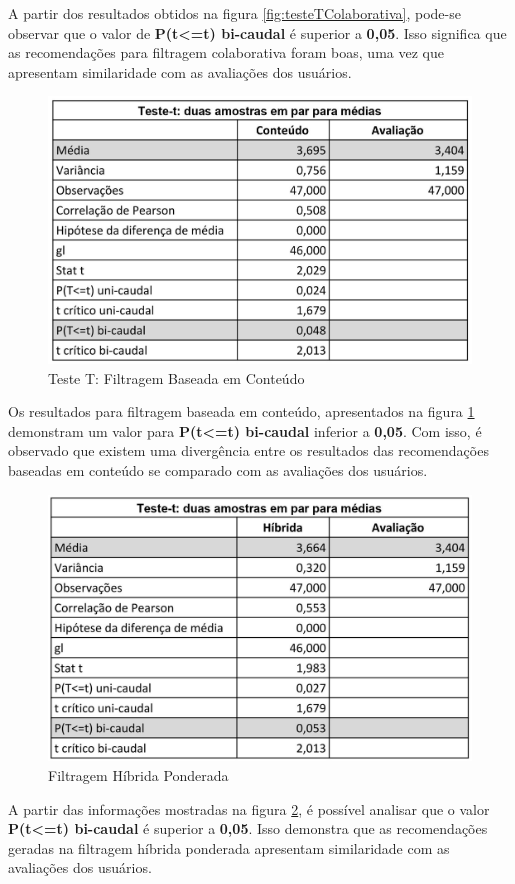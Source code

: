 A partir dos resultados obtidos na figura \ref{fig:testeTColaborativa}, pode-se observar que o valor de \textbf{P(t<=t) bi-caudal} é superior a \textbf{0,05}. Isso significa que as recomendações para filtragem colaborativa foram boas, uma vez que apresentam similaridade com as avaliações dos usuários.

\begin{figure}[H]
	\centering
	\includegraphics[width=.7\linewidth]{imagens/testeTConteudo.jpg}
	\caption[Teste T: Filtragem Baseada em Conteúdo]{Teste T: Filtragem Baseada em Conteúdo}
    \label{fig:testeTConteudo}
\end{figure}

Os resultados para filtragem baseada em conteúdo, apresentados na figura \ref{fig:testeTConteudo} demonstram um valor para \textbf{P(t<=t) bi-caudal} inferior a \textbf{0,05}. Com isso, é observado que existem uma divergência entre os resultados das recomendações baseadas em conteúdo se comparado com as avaliações dos usuários.

\begin{figure}[H]
	\centering
	\includegraphics[width=.7\linewidth]{imagens/testeTPonderada.jpg}
	\caption[Teste T: Filtragem Híbrida Ponderada]{Filtragem Híbrida Ponderada}
    \label{fig:testeTPonderado}
\end{figure}

A partir das informações mostradas na figura \ref{fig:testeTPonderado}, é possível analisar que o valor \textbf{P(t<=t) bi-caudal} é superior a \textbf{0,05}. Isso demonstra que as recomendações geradas na filtragem híbrida ponderada apresentam similaridade com as avaliações dos usuários.

